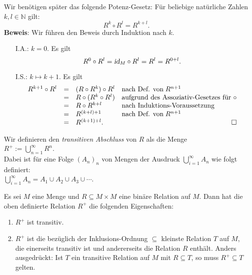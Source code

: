 Wir benötigen später das folgende Potenz-Gesetz:  Für beliebige 
natürliche Zahlen $k,l \in \mathbb{N}$ gilt:
\[ R^k \circ R^l = R^{k+l}. \]
\textbf{Beweis}:  Wir führen den Beweis durch Induktion nach $k$.
\begin{enumerate}
\item[I.A.:] $k = 0$.  Es gilt
             \[ R^0 \circ R^l = \textsl{id}_M \circ R^l = R^l = R^{0+l}. \]
\item[I.S.:] $k \mapsto k+1$.  Es gilt
             \[
             \begin{array}{lcll}
               R^{k+1} \circ R^l & = & (R \circ R^k) \circ R^l &
                                       \mbox{nach Def. von}\; R^{n+1} \\
                                 & = & R \circ (R^k \circ R^l) &
                                       \mbox{aufgrund des Assoziativ-Gesetzes für $\circ$}                                       \\
                                 & = & R \circ R^{k+l} &
                                       \mbox{nach Induktions-Voraussetzung} \\
                                 & = & R^{(k+l)+1} &
                                       \mbox{nach Def. von}\; R^{n+1} \\
                                 & = & R^{(k+1)+l}. & \hspace*{\fill} \Box
             \end{array}
             \]
\end{enumerate}
\vspace*{0.3cm}

\noindent
Wir definieren den \emph{transitiven Abschluss} von $R$ als die Menge \\[0.2cm]
\hspace*{1.3cm} $R^+ := \bigcup\limits_{n=1}^{\infty} R^n$. \\
Dabei ist für eine Folge $(A_n)_n$ von Mengen der Ausdruck $\bigcup\limits_{i=1}^{\infty} A_n$ 
wie folgt definiert: \\[-0.1cm]
\hspace*{1.3cm} $\bigcup\limits_{i=1}^{\infty} A_n = A_1 \cup A_2 \cup A_3 \cup \cdots $. \\[0.2cm]

\begin{Satz}
Es sei $M$ eine Menge und $R \subseteq M \times M$ eine binäre Relation auf $M$.
Dann hat die oben definierte Relation $R^+$ die folgenden Eigenschaften:
\begin{enumerate}
\item $R^+$ ist transitiv.
\item $R^+$   ist die bezüglich der Inklusions-Ordnung $\subseteq$ kleinste Relation
      $T$ auf $M$, die einerseits transitiv ist und andererseits die Relation $R$ enthält.
      Anders ausgedrückt: Ist $T$ ein transitive Relation auf $M$ mit $R \subseteq T$, so
      muss $R^+ \subseteq T$ gelten.
\end{enumerate}
\end{Satz}

